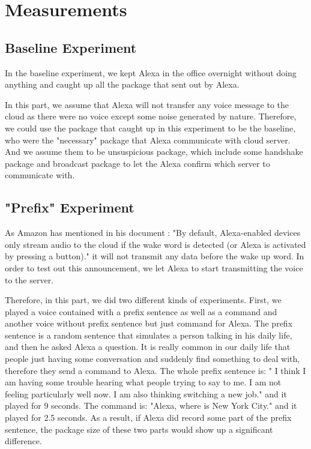 \section{Measurements}

\subsection{Baseline Experiment}

In the baseline experiment, we kept Alexa in the office overnight without doing anything and caught up all the package that sent out by Alexa.

In this part, we assume that Alexa will not transfer any voice message to the cloud as there were no voice except some noise generated by nature. Therefore, we could use the package that caught up in this experiment to be the baseline, who were the "necessary" package that Alexa communicate with cloud server. And we assume them to be unsuspicious package, which include some handshake package and broadcast package to let the Alexa confirm which server to communicate with.






\subsection{"Prefix" Experiment}

As Amazon has mentioned in his document \todo{[1]}: "By default, Alexa-enabled devices only stream audio to the cloud if the wake word is detected (or Alexa is activated by pressing a button)." it will not transmit any data before the wake up word. In order to test out this announcement, we let Alexa to start transmitting the voice to the server. 

Therefore, in this part, we did two different kinds of experiments. First, we played a voice contained with a prefix sentence as well as a command and another voice without prefix sentence but just command for Alexa. The prefix sentence is a random sentence that simulates a person talking in his daily life, and then he asked Alexa a question. It is really common in our daily life that people just having some conversation and suddenly find something to deal with, therefore they send a command to Alexa. The whole prefix sentence is: " I think I am having some trouble hearing what people trying to say to me. I am not feeling particularly well now. I am also thinking switching a new job." and it played for 9 seconds. The command is: "Alexa, where is New York City." and it played for 2.5 seconds. As a result, if Alexa did record some part of the prefix sentence, the package size of these two parts would show up a significant difference.

